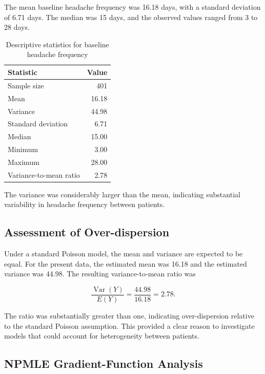 The mean baseline headache frequency was 16.18 days, with a
standard deviation of 6.71 days. The median was 15 days, and the
observed values ranged from 3 to 28 days.

\begin{table}[H]
\centering
\caption{Descriptive statistics for baseline headache frequency}
\label{tab:descriptive}
\begin{tabular}{lr}
\toprule
Statistic & Value \\
\midrule
Sample size & 401 \\
Mean & 16.18 \\
Variance & 44.98 \\
Standard deviation & 6.71 \\
Median & 15.00 \\
Minimum & 3.00 \\
Maximum & 28.00 \\
Variance-to-mean ratio & 2.78 \\
\bottomrule
\end{tabular}
\end{table}

The variance was considerably larger than the mean, indicating
substantial variability in headache frequency between patients.

\subsection{Assessment of Over-dispersion}

Under a standard Poisson model, the mean and variance are expected
to be equal. For the present data, the estimated mean was 16.18 and
the estimated variance was 44.98. The resulting variance-to-mean
ratio was

\[
\frac{\operatorname{Var}(Y)}{E(Y)}
=
\frac{44.98}{16.18}
=
2.78.
\]

The ratio was substantially greater than one, indicating
over-dispersion relative to the standard Poisson assumption. This
provided a clear reason to investigate models that could account for
heterogeneity between patients.

\subsection{NPMLE Gradient-Function Analysis}

